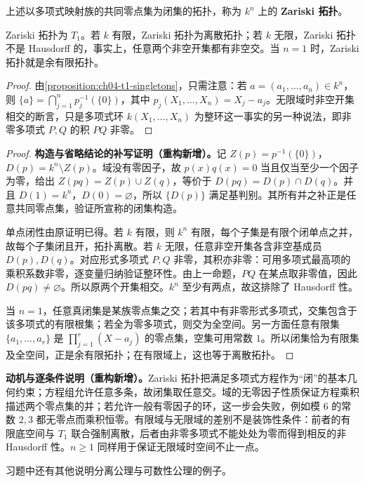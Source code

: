 \documentclass[../../main.tex]{subfiles}%
\begin{document}
\begin{definition}[Zariski 拓扑]\label{definition:ch04-zariski-topology}
上述以多项式映射族的共同零点集为闭集的拓扑，称为 $k^n$ 上的 \textbf{Zariski 拓扑}。
\end{definition}
\begin{proposition}\label{proposition:ch04-zariski-properties}
Zariski 拓扑为 $T_1$。若 $k$ 有限，Zariski 拓扑为离散拓扑；若 $k$ 无限，Zariski 拓扑不是 Hausdorff 的，事实上，任意两个非空开集都有非空交。当 $n=1$ 时，Zariski 拓扑就是余有限拓扑。
\end{proposition}
\begin{proof}
由\cref{proposition:ch04-t1-singletons}，只需注意：若 $a=(a_1,\ldots,a_n)\in k^n$，则 $\{a\}=\bigcap_{j=1}^np_j^{-1}(\{0\})$，其中 $p_j(X_1,\ldots,X_n)=X_j-a_j$。无限域时非空开集相交的断言，只是多项式环 $k(X_1,\ldots,X_n)$ 为整环这一事实的另一种说法，即非零多项式 $P,Q$ 的积 $PQ$ 非零。
\end{proof}
\begin{proof}
\textbf{构造与省略结论的补写证明（重构新增）。}记 $Z(p)=p^{-1}(\{0\})$，$D(p)=k^n\setminus Z(p)$。域没有零因子，故 $p(x)q(x)=0$ 当且仅当至少一个因子为零，给出 $Z(pq)=Z(p)\cup Z(q)$，等价于 $D(pq)=D(p)\cap D(q)$。并且 $D(1)=k^n$，$D(0)=\varnothing$，所以 $\{D(p)\}$ 满足基判别。其所有并之补正是任意共同零点集，验证所宣称的闭集构造。

单点闭性由原证明已得。若 $k$ 有限，则 $k^n$ 有限，每个子集是有限个闭单点之并，故每个子集闭且开，拓扑离散。若 $k$ 无限，任意非空开集各含非空基成员 $D(p),D(q)$。对应形式多项式 $P,Q$ 非零，其积亦非零：可用多项式最高项的乘积系数非零，逐变量归纳验证整环性。由上一命题，$PQ$ 在某点取非零值，因此 $D(pq)\ne\varnothing$。所以原两个开集相交。$k^n$ 至少有两点，故这排除了 Hausdorff 性。

当 $n=1$，任意真闭集是某族零点集之交；若其中有非零形式多项式，交集包含于该多项式的有限根集；若全为零多项式，则交为全空间。另一方面任意有限集 $\{a_1,\ldots,a_r\}$ 是 $\prod_{j=1}^r(X-a_j)$ 的零点集，空集可用常数 $1$。所以闭集恰为有限集及全空间，正是余有限拓扑；在有限域上，这也等于离散拓扑。
\end{proof}
\begin{remark}
\textbf{动机与逐条件说明（重构新增）。}Zariski 拓扑把满足多项式方程作为“闭”的基本几何约束；方程组允许任意多条，故闭集取任意交。域的无零因子性质保证方程乘积描述两个零点集的并；若允许一般有零因子的环，这一步会失败，例如模 $6$ 的常数 $2,3$ 都无零点而乘积恒零。有限域与无限域的差别不是装饰性条件：前者的有限底空间与 $T_1$ 联合强制离散，后者由非零多项式不能处处为零而得到相反的非 Hausdorff 性。$n\ge1$ 同样用于保证无限域时空间不止一点。
\end{remark}
习题中还有其他说明分离公理与可数性公理的例子。
\end{document}
